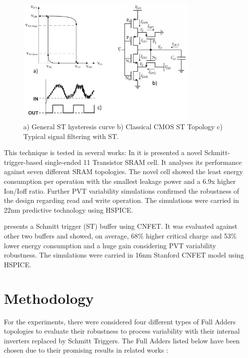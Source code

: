 \documentclass[ecp,tc, english]{iiufrgs}
\begin{document}
\begin{figure}[H]
\centering
\includegraphics[width=0.8\textwidth]{Hysteresis.png}
\caption{a) General ST hysteresis curve b) Classical CMOS ST Topology c) Typical signal filtering with ST.}
\label{fig:Fig3}
\end{figure}

This technique is tested in several works: In \cite{ahmad2016single} it is presented a novel Schmitt-trigger-based single-ended 11 Transistor SRAM cell. It analyses its performance against seven different SRAM topologies. The novel cell showed the least energy consumption per operation with the smallest leakage power and a 6.9x higher Ion/Ioff ratio. Further PVT variability simulations confirmed the robustness of the design regarding read and write operation. The simulations were carried in 22nm predictive technology using HSPICE.

\cite{moghaddam2017design} presents a Schmitt trigger (ST) buffer using CNFET. It was evaluated against other two buffers and showed, on average, 68\% higher critical charge and 53\% lower energy consumption and a huge gain considering PVT variability robustness. The simulations were carried in 16nm Stanford CNFET model using HSPICE.

\chapter{Methodology}

For the experiments, there were considered four different types of Full Adders topologies to evaluate their robustness to process variability with their internal inverters replaced by Schmitt Triggers. The Full Adders listed below have been chosen due to their promising results in related works \cite{ames2016investigating} \cite{dokania2015circuit} \cite{dokania2013investigation}:
\end{document}
